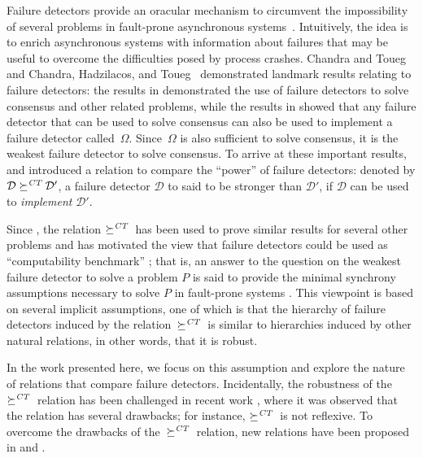 \documentclass[11pt]{article}
\newcommand{\ident}[1]{\textit{#1}\rule{0cm}{1ex}}
\newcommand{\D}{\mathcal{D}}
\newcommand{\problem}{P} \newcommand{\Alg}{A}
\newcommand{\redCT}{\succeq^\ident{CT}}
\begin{document}
Failure detectors \cite{chan:ufdfr} provide an oracular mechanism to
     circumvent  the impossibility of several problems in fault-prone
     asynchronous systems~\cite{FLP,fich:03:hirdc}.
Intuitively, the idea is to enrich asynchronous systems with
     information about failures that may be useful to overcome the
     difficulties posed by process crashes.
Chandra and Toueg~\cite{chan:ufdfr} and Chandra, Hadzilacos, and
     Toueg~\cite{chan:twfdf1} demonstrated landmark results relating to failure detectors: the results in \cite{chan:ufdfr} demonstrated the use of failure
     detectors to solve consensus and other related problems, while
     the results in \cite{chan:twfdf1} showed that any failure
     detector that can be used to solve consensus can also be used to
     implement a failure detector called~$\Omega$.
Since~$\Omega$ is also sufficient to solve consensus, it is the
     weakest failure detector to solve consensus.
To arrive at these important results, \cite{chan:ufdfr} and
     \cite{chan:twfdf1} introduced a relation to compare the ``power''
     of failure detectors: denoted by $\D\redCT \D'$, a failure detector $\D$ to said to be
     stronger than $\D'$, if $\D$ can be used to \emph{implement}
     $\D'$.
     
Since \cite{chan:twfdf1}, the relation $\redCT$ has been used to prove
     similar results for several other problems and has motivated the
     view that failure detectors could be used as ``computability
     benchmark'' \cite{FGK11}; that is, an answer to the question on
     the weakest failure detector  to solve a problem $\problem$ is
     said  to provide the minimal synchrony assumptions necessary to
     solve $\problem$ in fault-prone systems \cite{chan:twfdf1,FGK11}.
This viewpoint is based on several implicit assumptions, one of which
     is that the  hierarchy of failure detectors induced by the
     relation~$\redCT$ is similar to hierarchies induced by other
     natural relations, in other words, that it is robust.


In the work presented here, we focus on this assumption and explore
     the nature of relations that compare failure detectors.
Incidentally, the robustness of the $\redCT$ relation has been
     challenged in recent work
     \cite{jayanti:ephawfd,charron-bost:10:isolt,cornejoetalAFD,cornejoetalAFD-TR}, where it was
     observed that the relation has several drawbacks; for instance,
     $\redCT$ is not reflexive.
To overcome the drawbacks of the~$\redCT$ relation, new relations have
     been proposed in \cite{jayanti:ephawfd} and
     \cite{charron-bost:10:isolt}.
\end{document}

